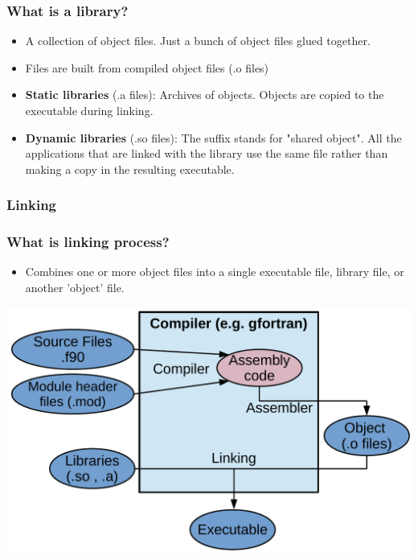 \documentclass[t]{myBeamer}
\begin{document}
\begin{frame}[t]
\frametitle{ \huge What is a library?}
\large
\begin{itemize}
 \item A collection of object files. Just a bunch of object files glued together.
 \item Files are built from compiled object files (.o files)
 \item \textbf{Static libraries} (.a files): Archives of objects. Objects are copied to the executable during linking.
 \item \textbf{Dynamic libraries} (.so files): The suffix stands for "shared object".
 All the applications that are linked with the library use the same file
 rather than making a copy in the resulting executable.
\end{itemize}
\end{frame}

\subsubsection{Linking} 
\begin{frame}[t]
\frametitle{ \huge What is linking process?}

\large
\begin{itemize}
 \item Combines one or more object files into a single executable file, library file, or another 'object' file.
\end{itemize}

\centering
\includegraphics[height=0.5\textheight]{img/compilationProcess.pdf} 
\end{frame}
\end{document}
